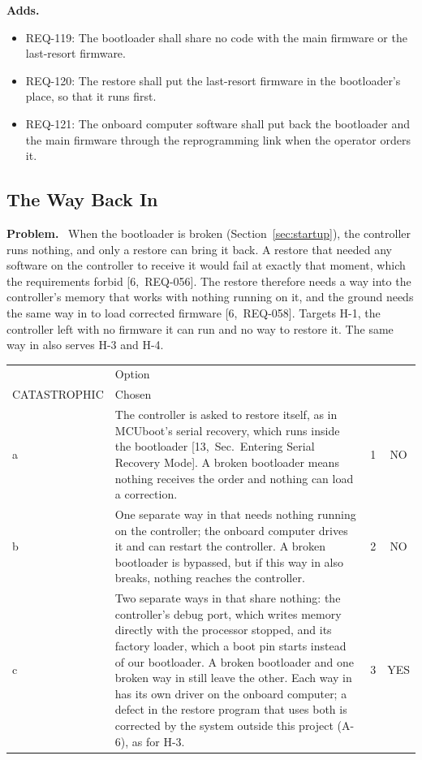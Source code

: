 \documentclass[11pt,a4paper]{article}
\makeatletter
\newcommand{\sev}[2]{\begin{tabular}[b]{@{}c@{}}#1\\{\scriptsize #2}\end{tabular}}
\newcommand{\field}[1]{\par\needspace{4\baselineskip}\smallskip\noindent\textbf{#1.}~}
\makeatother
\begin{document}
\field{Adds}
\begin{itemize}
\item REQ-119: The bootloader shall share no code with the main firmware or the last-resort firmware.
\item REQ-120: The restore shall put the last-resort firmware in the bootloader's place, so that it runs first.
\item REQ-121: The onboard computer software shall put back the bootloader and the main firmware through the reprogramming link when the operator orders it.
\end{itemize}

\subsection{The Way Back In}
\label{sec:wayback}
\field{Problem} When the bootloader is broken (Section~\ref{sec:startup}),
the controller runs nothing, and only a restore can bring it back. A restore
that needed any software on the controller to receive it would fail at exactly
that moment, which the requirements forbid [6,~REQ-056]. The restore therefore
needs a way into the controller's memory that works with nothing running on
it, and the ground needs the same way in to load corrected firmware
[6,~REQ-058]. Targets H-1, the controller left with no firmware it can run and
no way to restore it. The same way in also serves H-3 and H-4.

\smallskip
{\small\noindent\begin{tabularx}{\textwidth}{@{}l>{\raggedright\arraybackslash}Xcc@{}}
\toprule
 & Option & \sev{H-1}{CATASTROPHIC} & Chosen \\
\midrule
a & The controller is asked to restore itself, as in MCUboot's serial recovery, which runs inside the bootloader [13,~Sec.~Entering Serial Recovery Mode]. A broken bootloader means nothing receives the order and nothing can load a correction. & 1 & NO \\
b & One separate way in that needs nothing running on the controller; the onboard computer drives it and can restart the controller. A broken bootloader is bypassed, but if this way in also breaks, nothing reaches the controller. & 2 & NO \\
c & Two separate ways in that share nothing: the controller's debug port, which writes memory directly with the processor stopped, and its factory loader, which a boot pin starts instead of our bootloader. A broken bootloader and one broken way in still leave the other. Each way in has its own driver on the onboard computer; a defect in the restore program that uses both is corrected by the system outside this project (A-6), as for H-3. & 3 & YES \\
\bottomrule
\end{tabularx}}
\end{document}
